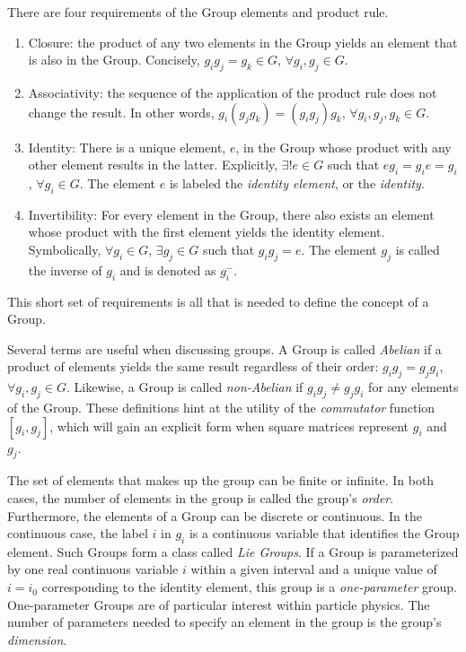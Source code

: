 There are four requirements of the Group elements and product rule.
\begin{enumerate}
    \item Closure: the product of any two elements in the Group yields an element that is also in the Group. Concisely, $g_ig_j=g_k\in G$, $\forall g_i,g_j\in G$.
    \item Associativity: the sequence of the application of the product rule does not change the result. In other words, $g_i(g_jg_k)=(g_ig_j)g_k$, $\forall g_i,g_j,g_k\in G$.
    \item Identity: There is a unique element, $e$, in the Group whose product with any other element results in the latter. Explicitly, $\exists!e\in G$ such that $eg_i=g_ie=g_i$, $\forall g_i\in G$. The element $e$ is labeled the \emph{identity element}, or the \emph{identity}.
    \item Invertibility: For every element in the Group, there also exists an element whose product with the first element yields the identity element. Symbolically, $\forall g_i\in G$, $\exists g_j\in G$ such that $g_ig_j=e$. The element $g_j$ is called the inverse of $g_i$ and is denoted as $g_i^{-}$.
\end{enumerate}
This short set of requirements is all that is needed to define the concept of a Group.

Several terms are useful when discussing groups.
A Group is called \emph{Abelian} if a product of elements yields the same result regardless of their order: $g_ig_j=g_jg_i$, $\forall g_i,g_j\in G$.
Likewise, a Group is called \emph{non-Abelian} if $g_ig_j\ne g_jg_i$ for any elements of the Group.
These definitions hint at the utility of the \emph{commutator} function $[g_i,g_j]$, which will gain an explicit form when square matrices represent $ g_i$ and $g_j$.

The set of elements that makes up the group can be finite or infinite.
In both cases, the number of elements in the group is called the group's \emph{order}.
Furthermore, the elements of a Group can be discrete or continuous.
In the continuous case, the label $i$ in $g_i$ is a continuous variable that identifies the Group element.
Such Groups form a class called \emph{Lie Groups}.
If a Group is parameterized by one real continuous variable $i$ within a given interval and a unique value of $i=i_0$ corresponding to the identity element, this group is a \emph{one-parameter} group. 
One-parameter Groups are of particular interest within particle physics.
The number of parameters needed to specify an element in the group is the group's \emph{dimension}.

